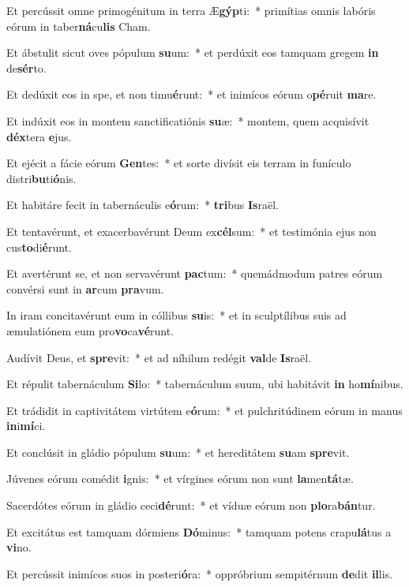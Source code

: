 \item Et percússit omne primogénitum in terra Æ\textbf{gýp}ti:~* primítias omnis labóris eórum in taber\textbf{ná}cu\textbf{lis} Cham.
\item Et ábstulit sicut oves pópulum \textbf{su}um:~* et perdúxit eos tamquam gregem \textbf{in} de\textbf{sér}to.
\item Et dedúxit eos in spe, et non timu\textbf{é}runt:~* et inimícos eórum o\textbf{pé}ruit \textbf{ma}re.
\item Et indúxit eos in montem sanctificatiónis \textbf{su}æ:~* montem, quem acquisívit \textbf{déx}tera \textbf{e}jus.
\item Et ejécit a fácie eórum \textbf{Gen}tes:~* et sorte divísit eis terram in funículo distri\textbf{bu}ti\textbf{ó}nis.
\item Et habitáre fecit in tabernáculis e\textbf{ó}rum:~* \textbf{tri}bus \textbf{Is}raël.
\item Et tentavérunt, et exacerbavérunt Deum ex\textbf{cél}sum:~* et testimónia ejus non cus\textbf{to}di\textbf{é}runt.
\item Et avertérunt se, et non servavérunt \textbf{pac}tum:~* quemádmodum patres eórum convérsi sunt in \textbf{ar}cum \textbf{pra}vum.
\item In iram concitavérunt eum in cóllibus \textbf{su}is:~* et in sculptílibus suis ad æmulatiónem eum pro\textbf{vo}ca\textbf{vé}runt.
\item Audívit Deus, et \textbf{spre}vit:~* et ad níhilum redégit \textbf{val}de \textbf{Is}raël.
\item Et répulit tabernáculum \textbf{Si}lo:~* tabernáculum suum, ubi habitávit \textbf{in} ho\textbf{mí}nibus.
\item Et trádidit in captivitátem virtútem e\textbf{ó}rum:~* et pulchritúdinem eórum in manus \textbf{in}i\textbf{mí}ci.
\item Et conclúsit in gládio pópulum \textbf{su}um:~* et hereditátem \textbf{su}am \textbf{spre}vit.
\item Júvenes eórum comédit \textbf{i}gnis:~* et vírgines eórum non sunt \textbf{la}men\textbf{tá}tæ.
\item Sacerdótes eórum in gládio ceci\textbf{dé}runt:~* et víduæ eórum non \textbf{plo}ra\textbf{bán}tur.
\item Et excitátus est tamquam dórmiens \textbf{Dó}minus:~* tamquam potens crapu\textbf{lá}tus a \textbf{vi}no.
\item Et percússit inimícos suos in posteri\textbf{ó}ra:~* oppróbrium sempitérnum \textbf{de}dit \textbf{il}lis.
